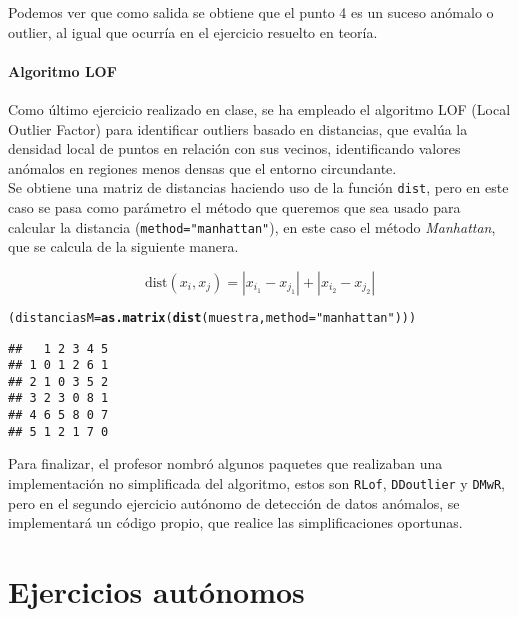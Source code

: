 \documentclass[12pt]{report}\usepackage[]{graphicx}\usepackage[dvipsnames]{xcolor}
\makeatletter
\newcommand{\hlstr}[1]{\textcolor[rgb]{0.192,0.494,0.8}{#1}}%
\newcommand{\hlstd}[1]{\textcolor[rgb]{0.345,0.345,0.345}{#1}}%
\newcommand{\hlkwb}[1]{\textcolor[rgb]{0.69,0.353,0.396}{#1}}%
\newcommand{\hlkwc}[1]{\textcolor[rgb]{0.333,0.667,0.333}{#1}}%
\newcommand{\hlkwd}[1]{\textcolor[rgb]{0.737,0.353,0.396}{\textbf{#1}}}%
\newenvironment{kframe}{%
 \def\at@end@of@kframe{}%
 \ifinner\ifhmode%
  \def\at@end@of@kframe{\end{minipage}}%
  \begin{minipage}{\columnwidth}%
 \fi\fi%
 \def\FrameCommand##1{\hskip\@totalleftmargin \hskip-\fboxsep
 \colorbox{shadecolor}{##1}\hskip-\fboxsep
     \hskip-\linewidth \hskip-\@totalleftmargin \hskip\columnwidth}%
 \MakeFramed {\advance\hsize-\width
   \@totalleftmargin\z@ \linewidth\hsize
   \@setminipage}}%
 {\par\unskip\endMakeFramed%
 \at@end@of@kframe}
\newenvironment{knitrout}{}{} %
\newcommand{\dt}{\text{dist}}
\makeatother
\begin{document}
					Podemos ver que como salida se obtiene que el punto 4 es un suceso anómalo o outlier, al igual que ocurría en el ejercicio resuelto en teoría.
				
				\subsubsection{Algoritmo LOF}
				
					Como último ejercicio realizado en clase, se ha empleado el algoritmo LOF (Local Outlier Factor) para identificar outliers basado en distancias, que evalúa la densidad local de puntos en relación con sus vecinos, identificando valores anómalos en regiones menos densas que el entorno circundante.\\
					
					Se obtiene una matriz de distancias haciendo uso de la función \texttt{dist}, pero en este caso se pasa como parámetro el método que queremos que sea usado para calcular la distancia (\texttt{method="manhattan"}), en este caso el método \textit{Manhattan}, que se calcula de la siguiente manera.
					
					$$
					\dt(x_i, x_j) = |x_{i_1} - x_{j_1}| + |x_{i_2} - x_{j_2}|
					$$
					
\begin{knitrout}
\color{fgcolor}\begin{kframe}
\begin{alltt}
\hlstd{(distanciasM}\hlkwb{=}\hlkwd{as.matrix}\hlstd{(}\hlkwd{dist}\hlstd{(muestra,} \hlkwc{method}\hlstd{=}\hlstr{"manhattan"}\hlstd{)))}
\end{alltt}
\begin{verbatim}
##   1 2 3 4 5
## 1 0 1 2 6 1
## 2 1 0 3 5 2
## 3 2 3 0 8 1
## 4 6 5 8 0 7
## 5 1 2 1 7 0
\end{verbatim}
\end{kframe}
\end{knitrout}
					
					Para finalizar, el profesor nombró algunos paquetes que realizaban una implementación no simplificada del algoritmo, estos son \texttt{RLof}, \texttt{DDoutlier} y \texttt{DMwR}, pero en el segundo ejercicio autónomo de detección de datos anómalos, se implementará un código propio, que realice las simplificaciones oportunas.
	
	\chapter{Ejercicios autónomos}
	
\end{document}
